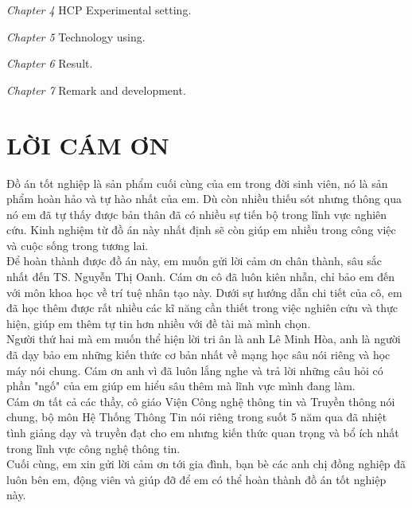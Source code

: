 \documentclass[13pt, a4paper]{extreport}
\begin{document}
\vspace{2mm}
\indent \textit{Chapter 4} HCP Experimental setting.

\vspace{2mm}
\indent \textit{Chapter 5} Technology using.

\vspace{2mm}
\indent \textit{Chapter 6} Result.

\vspace{2mm}
\indent \textit{Chapter 7} Remark and development.

\newpage
\chapter*{LỜI CÁM ƠN}
\indent Đồ án tốt nghiệp là sản phẩm cuối cùng của em trong đời sinh viên, nó là sản phẩm hoàn hảo và tự hào nhất của em. Dù còn nhiều thiếu sót nhưng thông qua nó em đã tự thấy được bản thân đã có nhiều sự tiến bộ trong lĩnh vực nghiên cứu. Kinh nghiệm từ đồ án này nhất định sẽ còn giúp em nhiều trong công việc và cuộc sống trong tương lai.\\
\indent Để hoàn thành được đồ án này, em muốn gửi lời cảm ơn chân thành, sâu sắc nhất đến TS. Nguyễn Thị Oanh. Cám ơn cô đã luôn kiên nhẫn, chỉ bảo em đến với môn khoa học về trí tuệ nhân tạo này. Dưới sự hướng dẫn chi tiết của cô, em đã học thêm được rất nhiều các kĩ năng cần thiết trong việc nghiên cứu và thực hiện, giúp em thêm tự tin hơn nhiều với đề tài mà mình chọn.\\
\indent Người thứ hai mà em muốn thể hiện lời tri ân là anh Lê Minh Hòa, anh là người đã dạy bảo em những kiến thức cơ bản nhất về mạng học sâu nói riêng và học máy nói chung. Cám ơn anh vì đã luôn lắng nghe và trả lời những câu hỏi có phần "ngố" của em giúp em hiểu sâu thêm mà lĩnh vực mình đang làm.\\
\indent Cám ơn tất cả các thầy, cô giáo Viện Công nghệ thông tin và Truyền thông nói chung, bộ môn Hệ Thống Thông Tin nói riêng trong suốt 5 năm qua đã nhiệt tình giảng dạy và truyền đạt cho em nhưng kiến thức quan trọng và bổ ích nhất trong lĩnh vực công nghệ thông tin.\\
\indent Cuối cùng, em xin gửi lời cảm ơn tới gia đình, bạn bè các anh chị đồng nghiệp  đã luôn bên em, động viên và giúp đỡ để em có thể hoàn thành đồ án tốt nghiệp này.
\newpage
\thispagestyle{empty}
\renewcommand{\listfigurename}{\bfseries\Large DANH SÁCH HÌNH ẢNH\hfill} 
\listoffigures
\renewcommand{\listtablename}{\bfseries\Large DANH SÁCH BẢNG\hfill}
\listoftables
{}
\renewcommand{\contentsname}{\bfseries\Large MỤC LỤC\hfill}
\tableofcontents
\cleardoublepage
{}
\clearpage
\newpage
\end{document}
